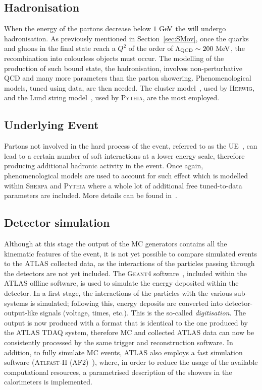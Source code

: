 		\subsection*{Hadronisation}

			When the energy of the partons decrease below $1 \GeV$ the  will undergo hadronisation. As previously mentioned in Section~\ref{sec:SMov}, once the quarks and gluons in the final state reach a $Q^2$ of the order of $\Lambda_{\mathrm{QCD}} \sim 200 \MeV$, the recombination into colourless objects must occur. The modelling of the production of such bound state, the hadronisation, involves non-perturbative \ac{QCD} and many more parameters than the parton showering. Phenomenological models, tuned using data, are then needed. The cluster model~\cite{ClusterHerwig1999}, used by \textsc{Herwig}, and the Lund string model~\cite{LundModel2002}, used by \textsc{Pythia}, are the most employed. 

		\subsection*{Underlying Event}

			Partons not involved in the hard process of the event, referred to as the \ac{UE}~\cite{Field2008}, can lead to a certain number of soft interactions at a lower energy scale, therefore producing additional hadronic activity in the event. Once again, phenomenological models are used to account for such effect which is modelled within \textsc{Sherpa} and \textsc{Pythia} where a whole lot of additional free tuned-to-data parameters are included. More details can be found in~\cite{Field2008}.

		\subsection*{Detector simulation}
		\label{subsec:detSim}

			Although at this stage the output of the \ac{MC} generators contains all the kinematic features of the event, it is not yet possible to compare simulated events to the \ac{ATLAS} collected data, as the interactions of the particles passing through the detectors are not yet included. The \textsc{Geant4} software~\cite{Geant42003}, included within the \ac{ATLAS} offline software, is used to simulate the energy deposited within the detector. In a first stage, the interactions of the particles with the various sub-systems is simulated; following this, energy deposits are converted into detector-output-like signals (voltage, times, etc.). This is the so-called \emph{digitisation}. The output is now produced with a format that is identical to the one produced by the \ac{ATLAS} \acl{TDAQ} system, therefore \ac{MC} and collected \ac{ATLAS} data can now be consistently processed by the same trigger and reconstruction software. In addition, to fully simulate \ac{MC} events, \ac{ATLAS}	also employs a fast simulation software (\textsc{Atlfast-II} (AF2)~\cite{Lukas2012}), where, in order to reduce the usage of the available computational resources, a parametrised description of the showers in the calorimeters is implemented. 


